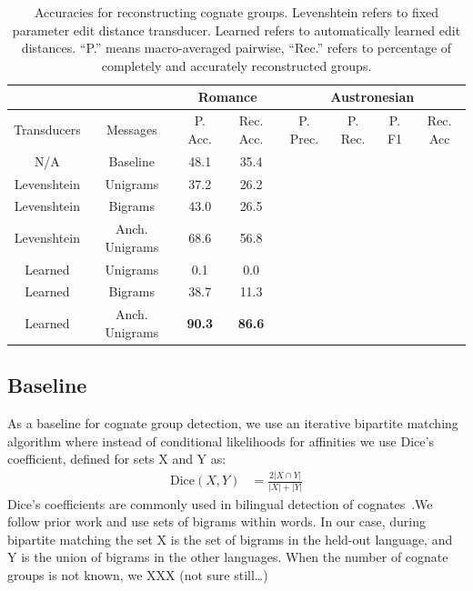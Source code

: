 \documentclass[11pt,a4paper]{article}
\begin{document}
\begin{table}
  \centering
  \begin{tabular}{|c|c|c|c||c|c|c|c||}
    \hline
    \multicolumn{2}{|c|}{\phantom{aa}} &\multicolumn{2}{|c||}{Romance} & \multicolumn{4}{|c||}{Austronesian}\\
    \hline
    Transducers & Messages & P. Acc. & Rec. Acc. & P. Prec. & P. Rec. & P. F1 & Rec. Acc\\
    \hline
    N/A & Baseline & 48.1 & 35.4  & & & &\\
    \hline
    Levenshtein&Unigrams & 37.2 & 26.2 & & & &\\
    Levenshtein&Bigrams & 43.0 & 26.5 & & & &\\
    Levenshtein&Anch. Unigrams & 68.6 & 56.8& & & &\\
    \hline 
    Learned&Unigrams & 0.1 & 0.0 & & & &\\
    Learned&Bigrams & 38.7 & 11.3 & & & &\\
    Learned&Anch. Unigrams & \textbf{90.3}  & \textbf{86.6} & & & &\\
    \hline
  \end{tabular}
  \caption{Accuracies for reconstructing cognate groups. Levenshtein
  refers to fixed parameter edit distance transducer. Learned refers
  to automatically learned edit distances. ``P.'' means macro-averaged
  pairwise, ``Rec.'' refers to percentage of completely and accurately
  reconstructed groups.}
  \label{tbl:exp1}
\end{table}

\subsection{Baseline}

As a baseline for cognate group detection, we use an iterative
bipartite matching algorithm where instead of conditional likelihoods
for affinities we use Dice's coefficient, defined for sets X and
Y as:
\begin{equation}
  \begin{split}
    \mathrm{Dice}(X,Y) &= \frac{2 |X\cap Y|}{|X| + |Y|}
   \end{split}
 \end{equation}
Dice's coefficients are commonly used in bilingual detection of
cognates~\cite{Kondrak01identifyingcognates,Kondrak03cognatescan}.We
follow prior work and use sets of bigrams within words. In our case, during
bipartite matching the set X is the set of bigrams in the held-out
language, and Y is the union of bigrams in the other languages.
When the number of cognate groups is not known, we XXX (not sure
still\dots)
\end{document}
